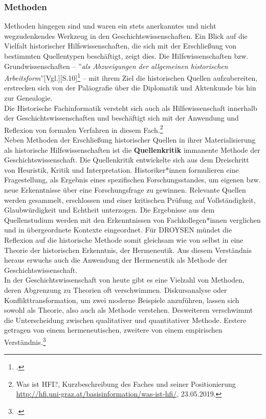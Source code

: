 \documentclass[12pt,a4paper]{article}
\begin{document}
\subsubsection{Methoden}

Methoden hingegen sind und waren ein stets anerkanntes und nicht wegzudenkendes Werkzeug in den Geschichtswissenschaften. Ein Blick auf die Vielfalt historischer Hilfswissenschaften, die sich mit der Erschließung von bestimmten Quellentypen beschäftigt, zeigt dies. Die Hilfswissenschaften bzw. Grundwissenschaften -- ''\textit{als Abzweigungen der allgemeinen historischen Arbeitsform}''[Vgl.][S.10]\footcite{von2007werkzeug} -- mit ihrem Ziel die historischen Quellen aufzubereiten, erstrecken sich von der Paläografie über die Diplomatik und Aktenkunde bis hin zur Genealogie.
\\
Die Historische Fachinformatik versteht sich auch als Hilfswissenschaft innerhalb der Geschichtswissenschaften und beschäftigt sich mit der Anwendung und Reflexion von formalen Verfahren in diesem Fach.\footnote{Was ist HFI?, Kurzbeschreibung des Faches und seiner Positionierung \protect\url{http://hfi.uni-graz.at/basisinformation/was-ist-hfi/}, 23.05.2019.} 
\\
Neben Methoden der Erschließung historischer Quellen in ihrer Materialisierung als historische Hilfswissenschaften ist die \textbf{Quellenkritik} immanente Methode der Geschichtswissenschaft. Die Quellenkritik entwickelte sich aus dem Dreischritt von Heuristik, Kritik und Interpretation. Historiker*innen formulieren eine Fragestellung, als Ergebnis eines spezifischen Forschungsstandes, um eigenen bzw. neue  Erkenntnisse über eine Forschungsfrage zu gewinnen. Relevante Quellen werden gesammelt, erschlossen und einer kritischen Prüfung auf Vollständigkeit, Glaubwürdigkeit und Echtheit unterzogen. Die Ergebnisse aus dem Quellenstudium werden mit den Erkenntnissen von Fachkollegen*innen verglichen und in übergeordnete Kontexte eingeordnet. Für DROYSEN mündet die Reflexion auf die historische Methode somit gleichsam wie von selbst in eine Theorie der historischen Erkenntnis, der Hermeneutik. Aus diesem Verständnis heraus erwuchs auch die Anwendung der Hermeneutik als Methode der Geschichtswissenschaft.
\\
In der Geschichtswissenschaft von heute gibt es eine Vielzahl von Methoden, deren Abgrenzung zu Theorien oft verschwimmen. Diskursanalyse oder Konflikttransformation, um zwei moderne Beispiele anzuführen, lassen sich sowohl als Theorie, also auch als Methode verstehen. Desweiteren verschwimmt die Unterscheidung zwischen qualitativer und quantitativer Methode. Erstere getragen von einem hermeneutischen, zweitere von einem empirischen Verständnis.\footcite[][S.2-5]{sokollgrundlagen} 
\end{document}
